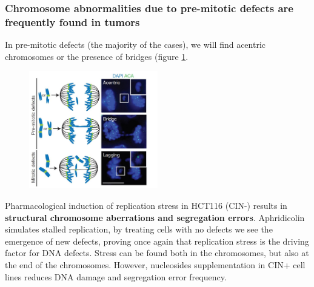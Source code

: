 \hypertarget{chromosome-abnormalities-due-to-pre-mitotic-defects-are-frequently-found-in-tumors}{%
\subsubsection{Chromosome abnormalities due to pre-mitotic defects are
frequently found in
tumors}\label{chromosome-abnormalities-due-to-pre-mitotic-defects-are-frequently-found-in-tumors}}

In pre-mitotic defects (the majority of the cases),  we will find acentric chromosomes or the presence of bridges (figure \ref{fig:defects}.

\begin{figure}[H]
\centering
\includegraphics[width=0.5\textwidth]{../_resources/0a2601fb2d9e7056294ad4c26f178951.png}  
\label{fig:defects}
\end{figure}

Pharmacological induction of replication stress in HCT116 (CIN-) results
in \textbf{structural chromosome aberrations and segregation errors}.
Aphridicolin simulates stalled replication, by treating cells with no
defects we see the emergence of new defects, proving once again that
replication stress is the driving factor for DNA defects. Stress can be
found both in the chromosomes, but also at the end of the chromosomes.
However, nucleosides supplementation in CIN+ cell lines reduces DNA damage
and segregation error frequency.

